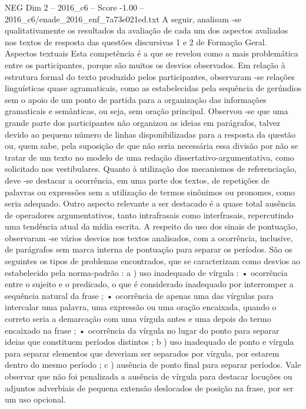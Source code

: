 \begin{textsample}{NEG Dim 2 – 2016\_c6 – Score -1.00 – 2016\_c6/enade\_2016\_enf\_7a73e021ed.txt}
A seguir, analisam -se qualitativamente os resultados da avaliação de cada um dos aspectos avaliados nos textos de resposta das questões discursivas 1 e 2 de Formação Geral.
Aspectos textuais Esta competência é a que se revelou como a mais problemática entre os participantes, porque são muitos os desvios observados.
Em relação à estrutura formal do texto produzido pelos participantes, observaram -se relações linguísticas quase agramaticais, como as estabelecidas pela sequência de gerúndios sem o apoio de um ponto de partida para a organização das informações gramaticais e semânticas, ou seja, sem oração principal.
Observou -se que uma grande parte dos participantes não organizou as ideias em parágrafos, talvez devido ao pequeno número de linhas disponibilizadas para a resposta da questão ou, quem sabe, pela suposição de que não seria necessária essa divisão por não se tratar de um texto no modelo de uma redação dissertativo-argumentativa, como solicitado nos vestibulares.
Quanto à utilização dos mecanismos de referenciação, deve -se destacar a ocorrência, em uma parte dos textos, de repetições de palavras ou expressões sem a utilização de termos sinônimos ou pronomes, como seria adequado.
Outro aspecto relevante a ser destacado é a quase total ausência de operadores argumentativos, tanto intrafrasais como interfrasais, repercutindo uma tendência atual da mídia escrita.
A respeito do uso dos sinais de pontuação, observaram -se vários desvios nos textos analisados, com a ocorrência, inclusive, de parágrafos sem marca interna de pontuação para separar os períodos.
São os seguintes os tipos de problemas encontrados, que se caracterizam como desvios ao estabelecido pela norma-padrão : a ) uso inadequado de vírgula : • ocorrência entre o sujeito e o predicado, o que é considerado inadequado por interromper a sequência natural da frase ; • ocorrência de apenas uma das vírgulas para intercalar uma palavra, uma expressão ou uma oração encaixada, quando o correto seria a demarcação com uma vírgula antes e uma depois do termo encaixado na frase ; • ocorrência da vírgula no lugar do ponto para separar ideias que constituem períodos distintos ; b ) uso inadequado de ponto e vírgula para separar elementos que deveriam ser separados por vírgula, por estarem dentro do mesmo período ; c ) ausência de ponto final para separar períodos.
Vale observar que não foi penalizada a ausência de vírgula para destacar locuções ou adjuntos adverbiais de pequena extensão deslocados de posição na frase, por ser um uso opcional.

\end{textsample}

